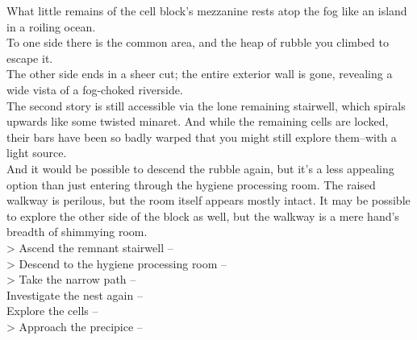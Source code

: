 What little remains of the cell block’s mezzanine rests atop the fog like an island in a roiling ocean. \\

To one side there is the common area, and the heap of rubble you climbed to escape it.\\

The other side ends in a sheer cut; the entire exterior wall is gone, revealing a wide vista of a fog-choked riverside.\\

The second story is still accessible via the lone remaining stairwell, which spirals upwards like some twisted minaret. And while the remaining cells are locked, their bars have been so badly warped that you might still explore them--with a light source.\\

And it would be possible to descend the rubble again, but it’s a less appealing option than just entering through the hygiene processing room. The raised walkway is perilous, but the room itself appears mostly intact. It may be possible to explore the other side of the block as well, but the walkway is a mere hand’s breadth of shimmying room.\\

> Ascend the remnant stairwell -- \\
> Descend to the hygiene processing room -- \\
> Take the narrow path -- \\
 Investigate the nest again -- \\
 Explore the cells -- \\
> Approach the precipice -- \\